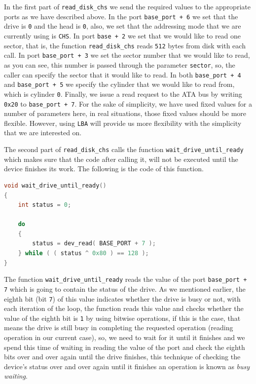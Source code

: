 In the first part of \lstinline!read_disk_chs! we send the required
values to the appropriate ports as we have described above. In the port
\lstinline!base_port + 6! we set that the drive is \lstinline!0! and the
head is \lstinline!0!, also, we set that the addressing mode that we are
currently using is \lstinline!CHS!. In port \lstinline!base + 2! we set
that we would like to read one sector, that is, the function
\lstinline!read_disk_chs! reads \lstinline!512! bytes from disk with
each call. In port \lstinline!base_port + 3! we set the sector number
that we would like to read, as you can see, this number is passed
through the parameter \lstinline!sector!, so, the caller can specify the
sector that it would like to read. In both \lstinline!base_port + 4! and
\lstinline!base_port + 5! we specify the cylinder that we would like to
read from, which is cylinder \lstinline!0!. Finally, we issue a read
request to the ATA bus by writing \lstinline!0x20! to
\lstinline!base_port + 7!. For the sake of simplicity, we have used
fixed values for a number of parameters here, in real situations, those
fixed values should be more flexible. However, using \lstinline!LBA!
will provide us more flexibility with the simplicity that we are
interested on.

The second part of \lstinline!read_disk_chs! calls the function
\texttt{wait\_drive\_until\_ready} which makes sure that the code after
calling it, will not be executed until the device finishes its work. The
following is the code of this function.

\begin{lstlisting}[language=C]
void wait_drive_until_ready()
{
    int status = 0;
    
    do
    {
        status = dev_read( BASE_PORT + 7 );
    } while ( ( status ^ 0x80 ) == 128 );
}
\end{lstlisting}

The function \texttt{wait\_drive\_until\_ready} reads the value of the
port \lstinline!base_port + 7! which is going to contain the status of
the drive. As we mentioned earlier, the eighth bit (bit \lstinline!7!)
of this value indicates whether the drive is busy or not, with each
iteration of the loop, the function reads this value and checks whether
the value of the eighth bit is \lstinline!1! by using bitwise
operations, if this is the case, that means the drive is still busy in
completing the requested operation (reading operation in our current
case), so, we need to wait for it until it finishes and we spend this
time of waiting in reading the value of the port and check the eighth
bits over and over again until the drive finishes, this technique of
checking the device's status over and over again until it finishes an
operation is known as \emph{busy waiting}.

